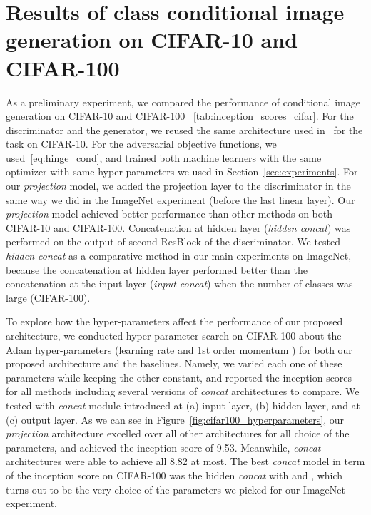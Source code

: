 \documentclass{article}
\begin{document}
\clearpage



\clearpage
\appendix

\section{\label{apdsec:cifar10_cifar100}Results of class conditional image generation on CIFAR-10 and CIFAR-100}
As a preliminary experiment, we compared the performance of conditional image generation on CIFAR-10 and CIFAR-100 ~\ref{tab:inception_scores_cifar}. 
For the discriminator and the generator, we reused the same architecture used in~\cite{miyato2018spectral} for the task on CIFAR-10. 
For the adversarial objective functions, we used~\eqref{eq:hinge_cond}, and trained both machine learners with the same optimizer with same hyper parameters we used in Section~\ref{sec:experiments}.
For our \textit{projection} model, we added the projection layer to the discriminator in the same way we did in the ImageNet experiment (before the last linear layer).
Our \textit{projection} model achieved better performance than other methods on both CIFAR-10 and CIFAR-100.  
Concatenation at hidden layer (\textit{hidden concat}) was performed on the output of second ResBlock of the discriminator.
We tested \textit{hidden concat} as a comparative method in our main experiments on ImageNet, because the concatenation at hidden layer performed better than the concatenation at the input layer (\textit{input concat}) when the number of classes was large (CIFAR-100).

To explore how the hyper-parameters affect the performance of our proposed architecture, we conducted hyper-parameter search on CIFAR-100 about the Adam hyper-parameters (learning rate  and 1st order momentum ) for both our proposed architecture and the baselines. Namely, we varied each one of these parameters while keeping the other constant, and reported the inception scores for all methods including several versions of \textit{concat} architectures to compare. We tested with \textit{concat} module introduced at (a) input layer, (b) hidden layer, and at (c) output layer. 
As we can see in Figure~\ref{fig:cifar100_hyperparameters}, our \textit{projection} architecture excelled over all other architectures for all choice of the parameters, and achieved the inception score of 9.53.  
Meanwhile, \textit{concat} architectures were able to achieve all 8.82 at most. 
The best \textit{concat} model in term of the inception score on CIFAR-100 was the hidden \textit{concat} with  and , which turns out to be the very choice of the parameters we picked for our ImageNet experiment.
\end{document}
